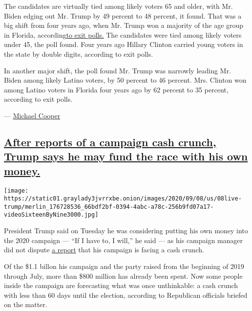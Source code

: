The candidates are virtually tied among likely voters 65 and older, with
Mr. Biden edging out Mr. Trump by 49 percent to 48 percent, it found.
That was a big shift from four years ago, when Mr. Trump won a majority
of the age group in Florida,
according\href{https://www.nbcnews.com/politics/2016-election/fl/}{to
exit polls.} The candidates were tied among likely voters under 45, the
poll found. Four years ago Hillary Clinton carried young voters in the
state by double digits, according to exit polls.

In another major shift, the poll found Mr. Trump was narrowly leading
Mr. Biden among likely Latino voters, by 50 percent to 46 percent. Mrs.
Clinton won among Latino voters in Florida four years ago by 62 percent
to 35 percent, according to exit polls.

--- \href{https://www.nytimes3xbfgragh.onion/by/michael-cooper}{Michael
Cooper}

\hypertarget{after-reports-of-a-campaign-cash-crunch-trump-says-he-may-fund-the-race-with-his-own-money}{%
\subsection{\texorpdfstring{\protect\hyperlink{after-reports-of-a-campaign-cash-crunch-trump-says-he-may-fund-the-race-with-his-own-money}{After
reports of a campaign cash crunch, Trump says he may fund the race with
his own
money.}}{After reports of a campaign cash crunch, Trump says he may fund the race with his own money.}}\label{after-reports-of-a-campaign-cash-crunch-trump-says-he-may-fund-the-race-with-his-own-money}}

\texttt{[image: https://static01.graylady3jvrrxbe.onion/images/2020/09/08/us/08live-trump/merlin\_176728536\_66bdf2bf-0394-4abc-a78c-256b9fd07a17-videoSixteenByNine3000.jpg]}

President Trump said on Tuesday he was considering putting his own money
into the 2020 campaign --- ``If I have to, I will,'' he said --- as his
campaign manager did not dispute
\href{https://www.nytimes3xbfgragh.onion/2020/09/07/us/politics/trump-election-campaign-fundraising.html}{a
report} that his campaign is facing a cash crunch.

Of the \$1.1 billon his campaign and the party raised from the beginning
of 2019 through July, more than \$800 million has already been spent.
Now some people inside the campaign are forecasting what was once
unthinkable: a cash crunch with less than 60 days until the election,
according to Republican officials briefed on the matter.

